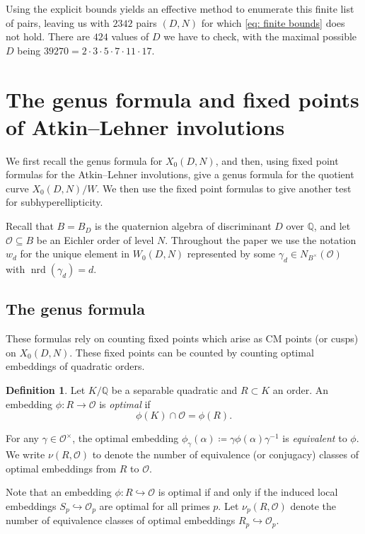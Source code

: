 \documentclass[12pt]{amsart}
\newcommand{\Q}{\mathbb{Q}}
\newcommand{\calO}{\mathcal{O}}
\DeclareMathOperator{\nrd}{nrd}
\numberwithin{equation}{subsection}
\theoremstyle{plain}\newtheorem{ithm}{Theorem}
\theoremstyle{plain}\newtheorem{iprop}[ithm]{Proposition}
\theoremstyle{definition}
\newtheorem{definition}[equation]{Definition}
\theoremstyle{remark}
\newcommand{\Order}{\calO} %
\newcommand{\Curve}[2]{X_0({#1},{#2})} %
\newcommand{\ALfull}[2]{W_0({#1},{#2})} %
\begin{document}
Using the explicit bounds yields an effective method to enumerate this finite list of pairs, leaving us with $2342$ pairs $(D,N)$ for which \eqref{eq: finite bounds} does not hold. There are $424$ values of $D$ we have to check, with the maximal possible $D$ being $39270 = 2 \cdot 3 \cdot 5 \cdot 7 \cdot 11 \cdot 17$. 

\section{The genus formula and fixed points of Atkin--Lehner involutions}
\label{sec:genusfixedpoints}
We first recall the genus formula for  $\Curve{D}{N}$, and then, using fixed point formulas for the Atkin--Lehner involutions, give a genus formula for the quotient curve $\Curve{D}{N} / W$. 
We then use the fixed point formulas to give another test for subhyperellipticity.

Recall that  $B = B_D$ is the quaternion algebra of discriminant $D$ over $\Q$, and let $\Order \subseteq B$ be an Eichler order of level $N$.
Throughout the paper we use the notation $w_d $ for the unique element  in $\ALfull{D}{N}$ represented by some $\gamma_d \in N_{B^{\times}}(\Order)$ with $\nrd(\gamma_d) = d$. 

\subsection{The genus formula}
\label{sec:genus}
These formulas rely on counting fixed points which arise as CM points (or cusps) on $\Curve{D}{N}$. 
These fixed points can be counted by counting optimal embeddings of quadratic orders.

\begin{definition}
    Let $K/\Q$ be a separable quadratic and $R \subset K$ an order.  An embedding $\phi: R \to \Order$ is \emph{optimal} if 
    \[ \phi(K) \cap \Order = \phi(R) .\]

    For any $\gamma  \in \Order^\times$, the optimal embedding $\phi_\gamma (\alpha) \coloneqq \gamma \phi(\alpha) \gamma^{-1}$ is \emph{equivalent} to $\phi$.
    We write $\nu(R,\Order)$ to denote the number of equivalence (or conjugacy) classes of optimal embeddings from $R$ to $\Order$.
\end{definition}

Note that an embedding $\phi: R \hookrightarrow \Order$ is optimal if and only if the induced local embeddings $S_p \hookrightarrow \Order_p$ are optimal for all primes $p$. Let $\nu_p(R, \Order)$ denote the number of equivalence classes of optimal embeddings $R_p \hookrightarrow \Order_p$.
\end{document}
